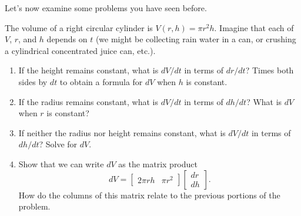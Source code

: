 Let's now examine some problems you have seen before. 
\begin{problem}\label{differential for volume of a cylinder}%
%
 The volume of a right circular cylinder is $V(r,h)= \pi r^2 h$.  Imagine that each of $V$, $r$, and $h$ depends on $t$ (we might be collecting rain water in a can, or crushing a cylindrical concentrated juice can, etc.).  
\begin{enumerate}
 \item If the height remains constant, what is $dV/dt$ in terms of $dr/dt$? Times both sides by $dt$ to obtain a formula for $dV$ when $h$ is constant.
 \item If the radius remains constant, what is $dV/dt$ in terms of $dh/dt$? What is $dV$ when $r$ is constant?
 \item If neither the radius nor height remains constant, what is $dV/dt$ in terms of $dh/dt$? Solve for $dV$.
 \item%
%
Show that we can write $dV$ as the matrix product 
$$dV = \begin{bmatrix}2\pi rh& \pi r^2\end{bmatrix}\begin{bmatrix}dr\\dh\end{bmatrix}.$$ 
How do the columns of this matrix relate to the previous portions of the problem.
\end{enumerate}
\end{problem}


